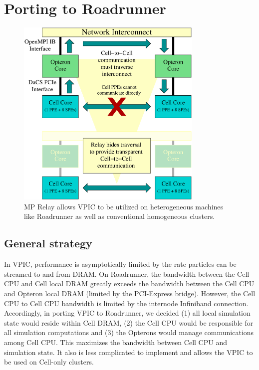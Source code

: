 \documentclass[journal,twoside]{IEEEtran}
\begin{document}
\section{Porting to Roadrunner}

\begin{figure}
\begin{center}
\includegraphics[width=3.5in]{figs/relay.eps}
\caption{MP Relay allows VPIC to be utilized on heterogeneous
machines like Roadrunner as well as conventional homogeneous
clusters.}
\label{fig:relay}
\end{center}
\end{figure}

\subsection{General strategy}

In VPIC, performance is asymptotically limited by the rate particles
can be streamed to and from DRAM.  On Roadrunner, the bandwidth
between the Cell CPU and Cell local DRAM greatly exceeds the bandwidth
between the Cell CPU and Opteron local DRAM (limited by the
PCI-Express bridge).  However, the Cell CPU to Cell CPU bandwidth is
limited by the internode Infiniband connection.  Accordingly, in
porting VPIC to Roadrunner, we decided (1) all local simulation state
would reside within Cell DRAM, (2) the Cell CPU would be responsible
for all simulation computations and (3) the Opterons would manage
communications among Cell CPU.  This maximizes the bandwidth between
Cell CPU and simulation state.  It also is less complicated to
implement and allows the VPIC to be used on Cell-only clusters.
\end{document}
